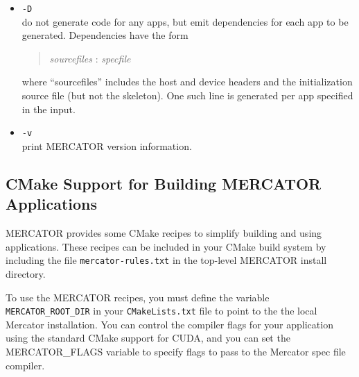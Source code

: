 \documentclass[11pt]{article}
\begin{document}
\begin{itemize}
\item \texttt{-D} \\
  do not generate code for any apps, but emit dependencies for
  each app to be generated.  Dependencies have the form
\begin{quote}
  \textit{sourcefiles} : \textit{specfile}
\end{quote}
where ``sourcefiles'' includes the host and device headers and the
initialization source file (but not the skeleton).  One such line is
generated per app specified in the input.

\item \texttt{-v} \\
   print MERCATOR version information.

\end{itemize}

\subsection{CMake Support for Building MERCATOR Applications}

MERCATOR provides some CMake recipes to simplify building and using
applications.  These recipes can be included in your CMake build
system by including the file \texttt{mercator-rules.txt} in the
top-level MERCATOR install directory.

To use the MERCATOR recipes, you must define the variable
\texttt{MERCATOR_ROOT_DIR} in your \texttt{CMakeLists.txt} file to
point to the the local Mercator installation.  You can control the
compiler flags for your application using the standard CMake support
for CUDA, and you can set the MERCATOR_FLAGS variable to specify
flags to pass to the Mercator spec file compiler.
\end{document}
